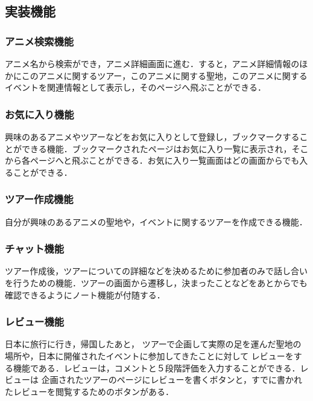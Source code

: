 \subsection{実装機能}


\subsubsection{アニメ検索機能}
\par
アニメ名から検索ができ，アニメ詳細画面に進む．すると，アニメ詳細情報のほかにこのアニメに関するツアー，このアニメに関する聖地，このアニメに関するイベントを関連情報として表示し，そのページへ飛ぶことができる．

\subsubsection{お気に入り機能}
\par
興味のあるアニメやツアーなどをお気に入りとして登録し，ブックマークすることができる機能．ブックマークされたページはお気に入り一覧に表示され，そこから各ページへと飛ぶことができる．お気に入り一覧画面はどの画面からでも入ることができる．

\subsubsection{ツアー作成機能}
\par
自分が興味のあるアニメの聖地や，イベントに関するツアーを作成できる機能．

\subsubsection{チャット機能}
\par
ツアー作成後，ツアーについての詳細などを決めるために参加者のみで話し合いを行うための機能．ツアーの画面から遷移し，決まったことなどをあとからでも確認できるようにノート機能が付随する．

\subsubsection{レビュー機能}
\par
日本に旅行に行き，帰国したあと，
ツアーで企画して実際の足を運んだ聖地の場所や，日本に開催されたイベントに参加してきたことに対して
レビューをする機能である．レビューは，コメントと５段階評価を入力することができる．レビューは
企画されたツアーのページにレビューを書くボタンと，すでに書かれたレビューを閲覧するためのボタンがある．
